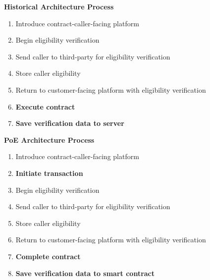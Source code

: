 \documentclass{article}
\begin{document}
\begin{multicols}{2}

\begin{center}
\textbf{Historical Architecture Process}
\end{center}
\begin{enumerate}
\item Introduce \Gls{contract-caller}-facing platform
\item Begin eligibility verification
\item Send caller to third-party for eligibility verification
\item Store caller eligibility
\item Return to customer-facing platform with eligibility verification
\item \textbf{Execute contract}
\item \textbf{Save verification data to server}
\end{enumerate}

\columnbreak

\begin{center}
\textbf{PoE Architecture Process}
\end{center}
\begin{enumerate}
\item Introduce \Gls{contract-caller}-facing platform
\item \textbf{Initiate transaction}
\item Begin eligibility verification
\item Send caller to third-party for eligibility verification
\item Store caller eligibility
\item Return to customer-facing platform with eligibility verification
\item \textbf{Complete contract}
\item \textbf{Save verification data to smart contract}
\end{enumerate}

\end{multicols}
\end{document}
